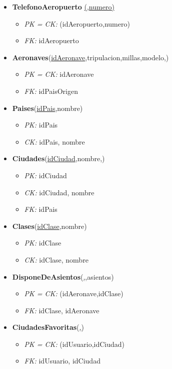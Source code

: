 \begin{itemize}
	\item \textbf{TelefonoAeropuerto} \underline{(,numero)}
		\begin{itemize}
			\item \textit{PK = CK: } (idAeropuerto,numero)
			\item \textit{FK: } idAeropuerto
		\end{itemize}
	\item \textbf{Aeronaves}(\underline{idAeronave},tripulacion,millas,modelo,)
		\begin{itemize}
			\item \textit{PK = CK: } idAeronave
			\item \textit{FK: } idPaisOrigen
		\end{itemize}
	\item \textbf{Paises}(\underline{idPais},nombre)
		\begin{itemize}
			\item \textit{PK: } idPais
			\item \textit{CK: } idPais, nombre
		\end{itemize}
	\item \textbf{Ciudades}(\underline{idCiudad},nombre,)
		\begin{itemize}
			\item \textit{PK: } idCiudad
			\item \textit{CK: } idCiudad, nombre
			\item \textit{FK: } idPais
		\end{itemize}
	\item \textbf{Clases}(\underline{idClase},nombre)
		\begin{itemize}
			\item \textit{PK: } idClase
			\item \textit{CK: } idClase, nombre
		\end{itemize}
	\item \textbf{DisponeDeAsientos}(\underline{,},asientos)
		\begin{itemize}
			\item \textit{PK = CK: } (idAeronave,idClase)
			\item \textit{FK: } idClase, idAeronave	
		\end{itemize}
	\item \textbf{CiudadesFavoritas}(\underline{,})
		\begin{itemize}
			\item \textit{PK = CK: } (idUsuario,idCiudad)
			\item \textit{FK: } idUsuario, idCiudad	
		\end{itemize}
\end{itemize}
